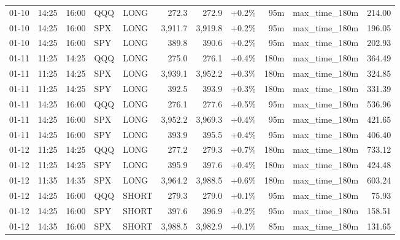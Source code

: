 \documentclass[11pt,a4paper,twoside]{article}
\begin{document}
\begin{center}
\begin{longtable}{>{\color{txtmain}}l l l l l r r r r >{\color{txtmain}}l r}
01-10 & 14:25 & 16:00 & QQQ & LONG & 272.3 & 272.9 & \textcolor{wingreen}{+0.2\%} & 95m & max\_time\_180m & \textcolor{wingreen}{214.00} \\
01-10 & 14:25 & 16:00 & SPX & LONG & 3,911.7 & 3,919.8 & \textcolor{wingreen}{+0.2\%} & 95m & max\_time\_180m & \textcolor{wingreen}{196.05} \\
01-10 & 14:25 & 16:00 & SPY & LONG & 389.8 & 390.6 & \textcolor{wingreen}{+0.2\%} & 95m & max\_time\_180m & \textcolor{wingreen}{202.93} \\
01-11 & 11:25 & 14:25 & QQQ & LONG & 275.0 & 276.1 & \textcolor{wingreen}{+0.4\%} & 180m & max\_time\_180m & \textcolor{wingreen}{364.49} \\
01-11 & 11:25 & 14:25 & SPX & LONG & 3,939.1 & 3,952.2 & \textcolor{wingreen}{+0.3\%} & 180m & max\_time\_180m & \textcolor{wingreen}{324.85} \\
01-11 & 11:25 & 14:25 & SPY & LONG & 392.5 & 393.9 & \textcolor{wingreen}{+0.3\%} & 180m & max\_time\_180m & \textcolor{wingreen}{331.39} \\
01-11 & 14:25 & 16:00 & QQQ & LONG & 276.1 & 277.6 & \textcolor{wingreen}{+0.5\%} & 95m & max\_time\_180m & \textcolor{wingreen}{536.96} \\
01-11 & 14:25 & 16:00 & SPX & LONG & 3,952.2 & 3,969.3 & \textcolor{wingreen}{+0.4\%} & 95m & max\_time\_180m & \textcolor{wingreen}{421.65} \\
01-11 & 14:25 & 16:00 & SPY & LONG & 393.9 & 395.5 & \textcolor{wingreen}{+0.4\%} & 95m & max\_time\_180m & \textcolor{wingreen}{406.40} \\
01-12 & 11:25 & 14:25 & QQQ & LONG & 277.2 & 279.3 & \textcolor{wingreen}{+0.7\%} & 180m & max\_time\_180m & \textcolor{wingreen}{733.12} \\
01-12 & 11:25 & 14:25 & SPY & LONG & 395.9 & 397.6 & \textcolor{wingreen}{+0.4\%} & 180m & max\_time\_180m & \textcolor{wingreen}{424.48} \\
01-12 & 11:35 & 14:35 & SPX & LONG & 3,964.2 & 3,988.5 & \textcolor{wingreen}{+0.6\%} & 180m & max\_time\_180m & \textcolor{wingreen}{603.24} \\
01-12 & 14:25 & 16:00 & QQQ & SHORT & 279.3 & 279.0 & \textcolor{wingreen}{+0.1\%} & 95m & max\_time\_180m & \textcolor{wingreen}{75.93} \\
01-12 & 14:25 & 16:00 & SPY & SHORT & 397.6 & 396.9 & \textcolor{wingreen}{+0.2\%} & 95m & max\_time\_180m & \textcolor{wingreen}{158.51} \\
01-12 & 14:35 & 16:00 & SPX & SHORT & 3,988.5 & 3,982.9 & \textcolor{wingreen}{+0.1\%} & 85m & max\_time\_180m & \textcolor{wingreen}{131.65} \\

\end{longtable}
\end{center}
\end{document}
